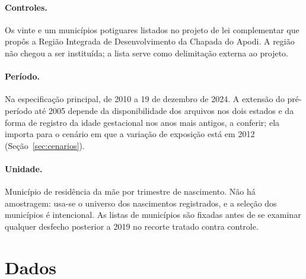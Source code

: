 \paragraph{Controles.} Os vinte e um municípios potiguares listados no projeto
de lei complementar que propôs a Região Integrada de Desenvolvimento da Chapada
do Apodi. A região não chegou a ser instituída; a lista serve como delimitação
externa ao projeto.

\paragraph{Período.} Na especificação principal, de 2010 a 19 de dezembro de
2024. A extensão do pré-período até 2005 depende da disponibilidade dos
arquivos nos dois estados e da forma de registro da idade gestacional nos anos
mais antigos, a conferir; ela importa para o cenário em que a variação de
exposição está em 2012 (Seção~\ref{sec:cenarios}).

\paragraph{Unidade.} Município de residência da mãe por trimestre de nascimento.
Não há amostragem: usa-se o universo dos nascimentos registrados, e a seleção
dos municípios é intencional. As listas de municípios são fixadas antes de se
examinar qualquer desfecho posterior a 2019 no recorte tratado contra
controle.

\section{Dados}

